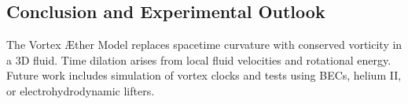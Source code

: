     \subsection{Conclusion and Experimental Outlook}
    The Vortex Æther Model replaces spacetime curvature with conserved vorticity in a 3D fluid. Time dilation arises from local fluid velocities and rotational energy. Future work includes simulation of vortex clocks and tests using BECs, helium II, or electrohydrodynamic lifters.

